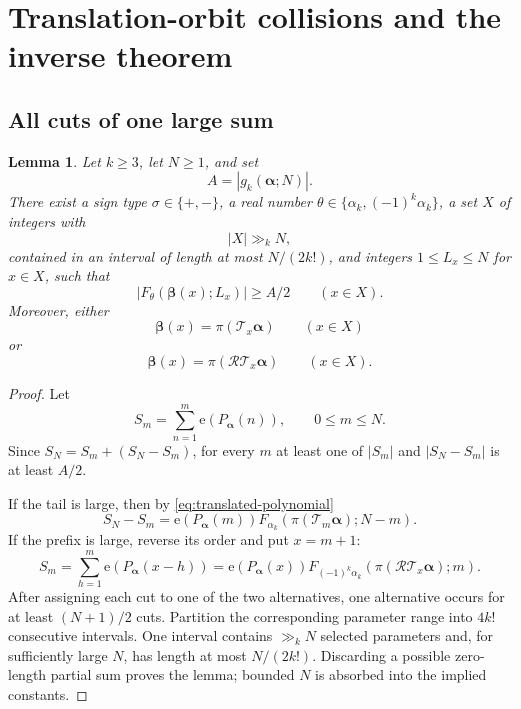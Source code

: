 \documentclass[11pt,reqno]{amsart}
\numberwithin{equation}{section}
\newtheorem{lemma}[lemma]{Lemma}
\theoremstyle{definition}
\theoremstyle{remark}
\newcommand{\e}{\mathrm e}
\newcommand{\cR}{\mathcal R}
\newcommand{\cT}{\mathcal T}
\begin{document}
\section{Translation-orbit collisions and the inverse theorem}

\subsection{All cuts of one large sum}

\begin{lemma}\label{lem:all-cuts}
Let $k\ge3$, let $N\ge1$, and set
\[
  A=|g_k(\boldsymbol\alpha;N)|.
\]
There exist a sign type $\sigma\in\{+,-\}$, a real number
$\theta\in\{\alpha_k,(-1)^k\alpha_k\}$, a set $X$ of integers with
\begin{equation}\label{eq:X-size}
  |X|\gg_k N,
\end{equation}
contained in an interval of length at most $N/(2k!)$, and integers
$1\le L_x\le N$ for $x\in X$, such that
\begin{equation}\label{eq:large-translated-partial}
  |F_\theta(\boldsymbol\beta(x);L_x)|\ge A/2
  \qquad(x\in X).
\end{equation}
Moreover, either
\begin{equation}\label{eq:forward-centres}
  \boldsymbol\beta(x)=\pi(\cT_x\boldsymbol\alpha)
  \qquad(x\in X)
\end{equation}
or
\begin{equation}\label{eq:backward-centres}
  \boldsymbol\beta(x)=\pi(\cR\cT_x\boldsymbol\alpha)
  \qquad(x\in X).
\end{equation}
\end{lemma}

\begin{proof}
Let
\[
  S_m=\sum_{n=1}^{m}\e(P_{\boldsymbol\alpha}(n)),
  \qquad 0\le m\le N.
\]
Since $S_N=S_m+(S_N-S_m)$, for every $m$ at least one of
$|S_m|$ and $|S_N-S_m|$ is at least $A/2$.

If the tail is large, then by \eqref{eq:translated-polynomial}
\[
  S_N-S_m
  =\e(P_{\boldsymbol\alpha}(m))
  F_{\alpha_k}(\pi(\cT_m\boldsymbol\alpha);N-m).
\]
If the prefix is large, reverse its order and put $x=m+1$:
\[
  S_m
  =\sum_{h=1}^{m}\e(P_{\boldsymbol\alpha}(x-h))
  =\e(P_{\boldsymbol\alpha}(x))
  F_{(-1)^k\alpha_k}(\pi(\cR\cT_x\boldsymbol\alpha);m).
\]
After assigning each cut to one of the two alternatives, one alternative occurs for at least $(N+1)/2$ cuts.  Partition the corresponding parameter range into $4k!$ consecutive intervals.  One interval contains $\gg_kN$ selected parameters and, for sufficiently large $N$, has length at most $N/(2k!)$.  Discarding a possible zero-length partial sum proves the lemma; bounded $N$ is absorbed into the implied constants.
\end{proof}
\end{document}
